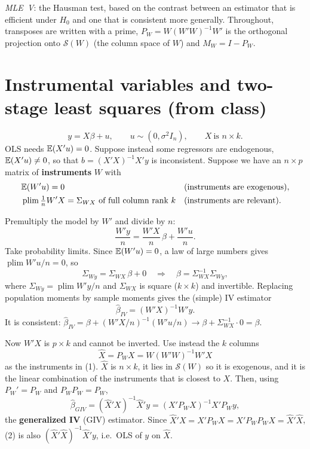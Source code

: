 \documentclass[11pt]{article}
\begin{document}

 \emph{MLE~V}: the Hausman test, based on the contrast between an estimator that is
efficient under $H_{0}$ and one that is consistent more generally. Throughout, transposes are written
with a prime, $P_{W}=W(W'W)^{-1}W'$ is the orthogonal projection onto $\mathcal S(W)$ (the column space of
$W$) and $M_{W}=I-P_{W}$.

\section{Instrumental variables and two-stage least squares (from class)}

\[ y=X\beta+u,\qquad u\sim(0,\sigma^{2}I_{n}),\qquad X\ \text{is } n\times k . \]
OLS needs $\mathbb{E}(X'u)=0$. Suppose instead some regressors are endogenous, $\mathbb{E}(X'u)\neq0$, so that
$b=(X'X)^{-1}X'y$ is inconsistent. Suppose we have an $n\times p$ matrix of \textbf{instruments} $W$ with
\begin{align*}
 &\mathbb{E}(W'u)=0 &&\text{(instruments are exogenous)},\\
 &\operatorname{plim}\tfrac1n W'X=\Sigma_{WX}\ \text{of full column rank } k &&\text{(instruments are relevant)}.
\end{align*}

Premultiply the model by $W'$ and divide by $n$:
\[ \frac{W'y}{n}=\frac{W'X}{n}\,\beta+\frac{W'u}{n}. \]
Take probability limits. Since $\mathbb{E}(W'u)=0$, a law of large numbers gives $\operatorname{plim}W'u/n=0$, so
\[ \Sigma_{Wy}=\Sigma_{WX}\,\beta+0
   \quad\Longrightarrow\quad
   \beta=\Sigma_{WX}^{-1}\Sigma_{Wy}, \]
where $\Sigma_{Wy}=\operatorname{plim}W'y/n$ and $\Sigma_{WX}$ is square ($k\times k$) and invertible. Replacing
population moments by sample moments gives the (simple) IV estimator
\begin{equation}\tag{1}
 \hat\beta_{IV}=(W'X)^{-1}W'y .
\end{equation}
It is consistent: $\hat\beta_{IV}=\beta+(W'X/n)^{-1}(W'u/n)\to\beta+\Sigma_{WX}^{-1}\cdot0=\beta$.

Now $W'X$ is $p\times k$ and cannot be inverted. Use instead the $k$ columns
\[ \hat X=P_{W}X=W(W'W)^{-1}W'X \]
as the instruments in (1). $\hat X$ is $n\times k$, it lies in $\mathcal S(W)$ so it is exogenous, and it is the
linear combination of the instruments that is closest to $X$. Then, using $P_{W}'=P_{W}$ and
$P_{W}P_{W}=P_{W}$,
\begin{equation}\tag{2}
 \hat\beta_{GIV}=(\hat X'X)^{-1}\hat X'y=(X'P_{W}X)^{-1}X'P_{W}y ,
\end{equation}
the \textbf{generalized IV} (GIV) estimator. Since $\hat X'X=X'P_{W}X=X'P_{W}P_{W}X=\hat X'\hat X$, (2) is also
$(\hat X'\hat X)^{-1}\hat X'y$, i.e.\ OLS of $y$ on $\hat X$.
\end{document}
